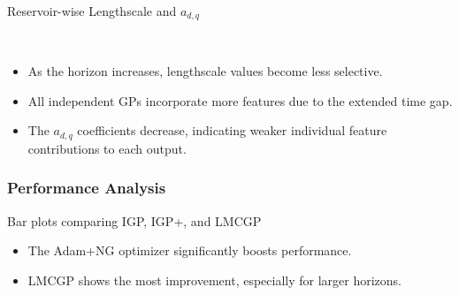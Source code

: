 \begin{frame}{Reservoir-wise Lengthscale and $a_{d, q}$}
\begin{figure}[htbp]
	\tiny
	\centering
	\setlength{} 
	\setlength{}
	\vspace{-1.5em}
	\\ %
\end{figure}


	\vspace{-1.0em}
	\begin{itemize}
	\item As the horizon increases, lengthscale values become less selective.
	\item All independent GPs incorporate more features due to the extended time gap.
	\item The \(a_{d,q}\) coefficients decrease, indicating weaker individual feature contributions to each output.
\end{itemize}
	
	
\end{frame}


\subsubsection{Performance Analysis}

\begin{frame}{Bar plots comparing IGP, IGP+, and LMCGP}
	\begin{figure}[htbp]
		\centering
		\setlength{}
		\setlength{}
		
		\subfloat[MSLL]{}
		\hfill
		\subfloat[NLPD]{}
		
	\end{figure}
	\vspace{-1.5em}
\begin{itemize}
	\item The Adam+NG optimizer significantly boosts performance.
	\item LMCGP shows the most improvement, especially for larger horizons.
\end{itemize}

	
	
\end{frame}


